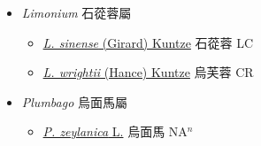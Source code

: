 
  \begin{itemize}
 \item[] \textit{Limonium} 石蓯蓉屬
                    
  \begin{itemize}
        \item[] \href{http://www.theplantlist.org/tpl1.1/search?q=Limonium+sinense}{\textit{L. sinense} (Girard) Kuntze}   石蓯蓉 LC
        \item[] \href{http://www.theplantlist.org/tpl1.1/search?q=Limonium+wrightii}{\textit{L. wrightii} (Hance) Kuntze}   烏芙蓉 CR
  \end{itemize}
 \item[] \textit{Plumbago} 烏面馬屬
                    
  \begin{itemize}
        \item[] \href{http://www.theplantlist.org/tpl1.1/search?q=Plumbago+zeylanica}{\textit{P. zeylanica} L.}   烏面馬 NA$^n$
  \end{itemize}
  \end{itemize}
